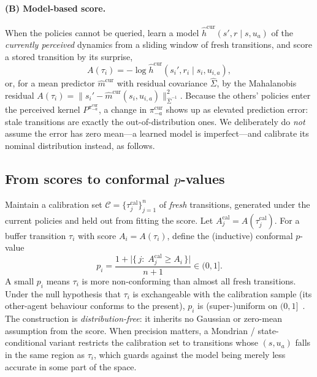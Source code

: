 \documentclass[sigconf]{aamas}
\newcommand{\picur}{\pi^{\mathrm{cur}}_{-a}}
\newcommand{\Ccal}{\mathcal{C}}
\begin{document}
\paragraph{(B) Model-based score.} When the policies cannot be queried, learn a
model $\hat h^{\mathrm{cur}}(s',r\mid s,u_a)$ of the \emph{currently perceived}
dynamics from a sliding window of fresh transitions, and score a stored
transition by its surprise,
\begin{equation}
\label{eq:score-model}
A(\tau_i)=-\log \hat h^{\mathrm{cur}}(s_i',r_i\mid s_i,u_{i,a}),
\end{equation}
or, for a mean predictor $\hat m^{\mathrm{cur}}$ with residual covariance
$\hat\Sigma$, by the Mahalanobis residual
$A(\tau_i)=\lVert s_i'-\hat m^{\mathrm{cur}}(s_i,u_{i,a})\rVert^2_{\hat\Sigma^{-1}}$.
Because the others' policies enter the perceived kernel
$P^{\picur}$, a change in $\picur$ shows up as elevated prediction error: stale
transitions are exactly the out-of-distribution ones. We deliberately do
\emph{not} assume the error has zero mean---a learned model is imperfect---and
calibrate its nominal distribution instead, as follows.

\subsection{From scores to conformal $p$-values}
\label{sec:pvalues}
Maintain a calibration set $\Ccal=\{\tau^{\mathrm{cal}}_j\}_{j=1}^n$ of
\emph{fresh} transitions, generated under the current policies and held out from
fitting the score. Let $A_j^{\mathrm{cal}}=A(\tau_j^{\mathrm{cal}})$. For a
buffer transition $\tau_i$ with score $A_i=A(\tau_i)$, define the (inductive)
conformal $p$-value
\begin{equation}
\label{eq:pvalue}
p_i=\frac{1+\big|\{\,j:\;A_j^{\mathrm{cal}}\ge A_i\,\}\big|}{n+1}\in(0,1].
\end{equation}
A small $p_i$ means $\tau_i$ is more non-conforming than almost all fresh
transitions. Under the null hypothesis that $\tau_i$ is exchangeable with the
calibration sample (its other-agent behaviour conforms to the present), $p_i$ is
(super-)uniform on $(0,1]$~\cite{vovk2005algorithmic}. The construction is
\emph{distribution-free}: it inherits no Gaussian or zero-mean assumption from
the score. When precision matters, a Mondrian / state-conditional variant
restricts the calibration set to transitions whose $(s,u_a)$ falls in the same
region as $\tau_i$, which guards against the model being merely less accurate in
some part of the space.
\end{document}
